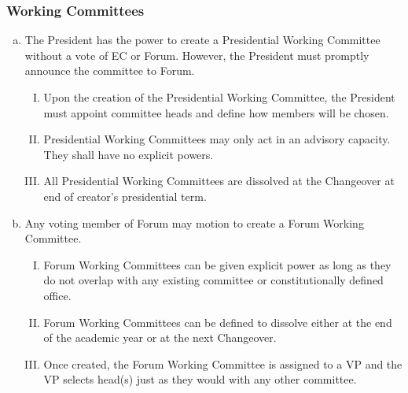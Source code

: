 \documentclass[USletter,12pt]{article}
\begin{document}
\begin{enumerate}[(a)]
\subsubsection{Working Committees}
\begin{enumerate}[(a)]
\item The President has the power to create a Presidential Working Committee without a vote of EC or Forum.  However, the President must promptly announce the committee to Forum.
	\begin{enumerate}[(I)]
	\item Upon the creation of the Presidential Working Committee, the President must appoint committee heads and define how members will be chosen.
	\item Presidential Working Committees may only act in an advisory capacity.  They shall have no explicit powers.
	\item All Presidential Working Committees are dissolved at the Changeover at end of creator's presidential term.
	\end{enumerate}
\item Any voting member of Forum may motion to create a Forum Working Committee.
	\begin{enumerate}[(I)]
	\item Forum Working Committees can be given explicit power as long as they do not overlap with any existing committee or constitutionally defined office.
	\item Forum Working Committees can be defined to dissolve either at the end of the academic year or at the next Changeover.
	\item Once created, the Forum Working Committee is assigned to a VP and the VP selects head(s) just as they would with any other committee.
	\end{enumerate}
\end{enumerate}


\end{enumerate}
\end{document}
